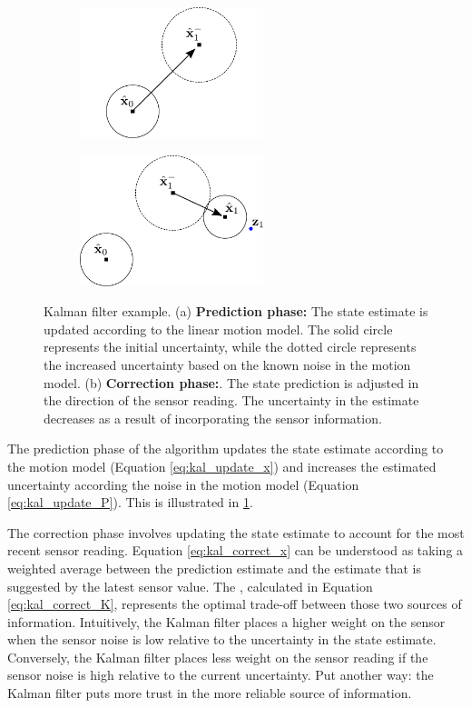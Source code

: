 \begin{figure}
  \begin{center}
    \begin{subfigure}[b]{0.4\textwidth}
      \includegraphics[height=1.5in]{probability/figs/kalman/kalman_pred.pdf}
      \caption{ }
    \end{subfigure} \hspace*{1in}
    \begin{subfigure}[b]{0.4\textwidth}
      \includegraphics[height=1.5in]{probability/figs/kalman/kalman_correct.pdf}
      \caption{}
    \end{subfigure}
  \end{center}
  \caption{Kalman filter example. (a) \textbf{Prediction phase:}  The state
    estimate is updated according to the linear motion model.  The
    solid circle represents the initial uncertainty, while the dotted
    circle represents the increased uncertainty based on the known noise
    in the motion model.  (b) \textbf{Correction phase:}.  The state
    prediction is adjusted in the direction of the sensor reading.
    The uncertainty in the estimate decreases as a result of
    incorporating the sensor information.}
  \label{fig:kalman_demo}
\end{figure}

The prediction phase of the algorithm updates the state estimate
according to the motion model (Equation \ref{eq:kal_update_x}) and
increases the estimated uncertainty according the noise in the motion
model (Equation \ref{eq:kal_update_P}). This is illustrated in
\ref{fig:kalman_demo}.


The correction phase involves updating the state estimate to account
for the most recent sensor reading. Equation \ref{eq:kal_correct_x}
can be understood as taking a weighted average between the prediction
estimate and the estimate that is suggested by the latest sensor
value. The , calculated in Equation
\ref{eq:kal_correct_K}, represents the optimal trade-off between those
two sources of information. Intuitively, the Kalman filter places a
higher weight on the sensor when the sensor noise is low relative to
the uncertainty in the state estimate. Conversely, the Kalman filter
places less weight on the sensor reading if the sensor noise is high
relative to the current uncertainty. Put another way: the Kalman
filter puts more trust in the more reliable source of information.


